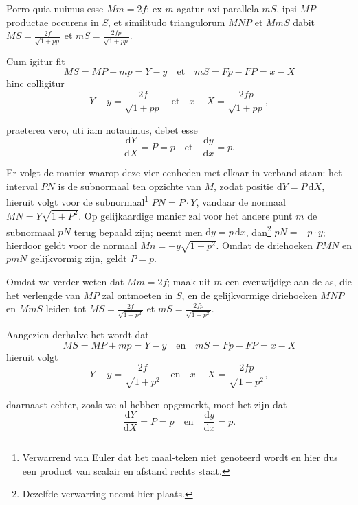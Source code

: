 \documentclass[10pt,a4paper]{article}
\def\D{\mathrm{d}}
\begin{document}
\begin{paracol}{2}
\begin{enumerate}[topsep=1px]
		\newpage
		
		Porro quia nuimus esse $Mm=2f$; ex $m$ agatur axi parallela $mS$, ipsi $MP$ productae occurens in $S$, et similitudo triangulorum $MNP$ et $MmS$ dabit $MS = \frac{2f}{\sqrt{1+pp}}$ et $mS = \frac{2fp}{\sqrt{1+pp}}$.
		\par Cum igitur fit
		\[
			MS = MP + mp = Y-y  \quad \text{et} \quad mS = Fp-FP = x-X
		\]
		hinc colligitur
		\[
			Y-y = \frac{2f}{\sqrt{1+pp}} \quad \text{et}\quad x-X = \frac{2fp}{\sqrt{1+pp}},
		\]
		
		\par praeterea vero, uti iam notauimus, debet esse
		\[
			\frac{\D Y}{\D X} = P = p \quad \text{et} \quad \frac{\D y}{\D x} = p.
		\]
		
		\switchcolumn
		
		\par Er volgt de manier waarop deze vier eenheden met elkaar in verband staan: het interval $PN$ is de subnormaal ten opzichte van $M$, zodat positie $\D Y = P\, \D X$, hieruit volgt voor de subnormaal\footnote{Verwarrend van Euler dat het maal-teken niet genoteerd wordt en hier dus een product van scalair en afstand rechts staat.} $PN = P\cdot Y$,  vandaar de normaal $MN = Y\sqrt{1+P^2}$. Op gelijkaardige manier zal voor het andere punt $m$ de subnormaal $pN$ terug bepaald zijn; neemt men $\D y = p \, \D x$, dan\footnote{Dezelfde verwarring neemt hier plaats.} $pN=-p\cdot y$; hierdoor geldt voor de normaal $Mn=-y\sqrt{1+p^2}$. Omdat de driehoeken $PMN$ en $pmN$ gelijkvormig zijn, geldt $P=p$. 
		
		\newpage
		Omdat we verder weten dat $Mm=2f$; maak uit $m$ een evenwijdige aan de as, die het verlengde van $MP$ zal ontmoeten in $S$, en de gelijkvormige driehoeken $MNP$ en $MmS$ leiden tot $MS = \frac{2f}{\sqrt{1+p^2}}$ et $mS = \frac{2fp}{\sqrt{1+p^2}}$.
		\par Aangezien derhalve het wordt dat
		\[
			MS = MP + mp = Y-y  \quad \text{en} \quad mS = Fp-FP = x-X
		\]
		hieruit volgt
		\[
			Y-y = \frac{2f}{\sqrt{1+p^2}} \quad \text{en}\quad x-X = \frac{2fp}{\sqrt{1+p^2}},
		\]
		\par daarnaast echter, zoals we al hebben opgemerkt, moet het zijn dat
		\[
			\frac{\D Y}{\D X} = P = p \quad \text{en} \quad \frac{\D y}{\D x} = p.
		\]
				
		\switchcolumn*
		

\end{enumerate}
\end{paracol}
\end{document}
